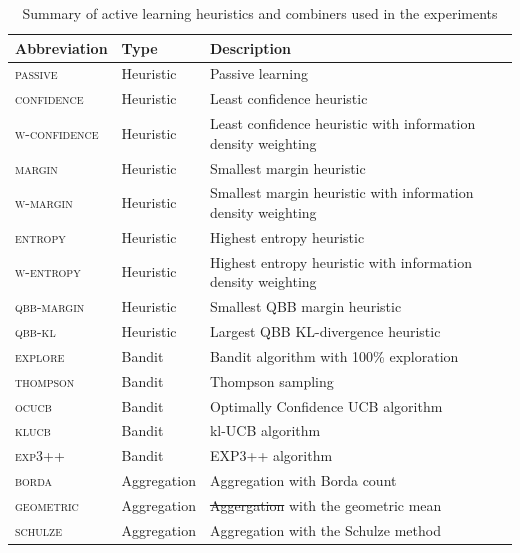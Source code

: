 \documentclass[fleqn,10pt,lineno]{wlpeerj} %
\providecommand{\DIFaddtex}[1]{{\protect\color{blue}\uwave{#1}}} %
\providecommand{\DIFdeltex}[1]{{\protect\color{red}\sout{#1}}}                      %
\providecommand{\DIFaddFL}[1]{\DIFadd{#1}} %
\providecommand{\DIFdelFL}[1]{\DIFdel{#1}} %
\providecommand{\DIFaddbeginFL}{} %
\providecommand{\DIFaddendFL}{} %
\providecommand{\DIFdelbeginFL}{} %
\providecommand{\DIFdelendFL}{} %
\providecommand{\DIFadd}[1]{\texorpdfstring{\DIFaddtex{#1}}{#1}} %
\providecommand{\DIFdel}[1]{\texorpdfstring{\DIFdeltex{#1}}{}} %
\begin{document}
\begin{table}[htbp]
	\caption {Summary of active learning heuristics and combiners used
	in the experiments} \label{tab:abbre}
	\centering
	\begin{tabular}{lll}
		\toprule
		Abbreviation & Type  & Description \\
		\midrule
        \textsc{passive}
        	& Heuristic & Passive learning \\
		\textsc{confidence}
			& Heuristic & Least confidence heuristic \\
		\textsc{w-confidence}
        	& Heuristic & Least confidence heuristic with information density weighting \\
        \textsc{margin}
        	& Heuristic & Smallest margin heuristic \\
        \textsc{w-margin}
        	& Heuristic & Smallest margin heuristic with information density weighting \\
        \textsc{entropy}
        	& Heuristic & Highest entropy heuristic \\
		\textsc{w-entropy}
        	& Heuristic & Highest entropy heuristic with information density weighting \\
        \textsc{qbb-margin}
        	& Heuristic & Smallest QBB margin heuristic \\
		\textsc{qbb-kl}
        	& Heuristic & Largest QBB KL-divergence heuristic \\
        \textsc{explore}
			& Bandit & Bandit algorithm with 100\% exploration \\
		\textsc{thompson}
        	& Bandit & Thompson sampling \\
		\textsc{ocucb}
			& Bandit & Optimally Confidence UCB algorithm \\
		\textsc{klucb}
			& Bandit & kl-UCB algorithm \\
		\textsc{exp3++}
			& Bandit & EXP3++ algorithm \\
		\textsc{borda}
			& Aggregation & Aggregation with Borda count \\
		\textsc{geometric}
			& Aggregation & \DIFdelbeginFL \DIFdelFL{Aggergation }\DIFdelendFL \DIFaddbeginFL \DIFaddFL{Aggregation }\DIFaddendFL with the geometric mean \\
		\textsc{schulze}
			& Aggregation & Aggregation with the Schulze method \\
		\bottomrule
	\end{tabular}
\end{table}
\end{document}
